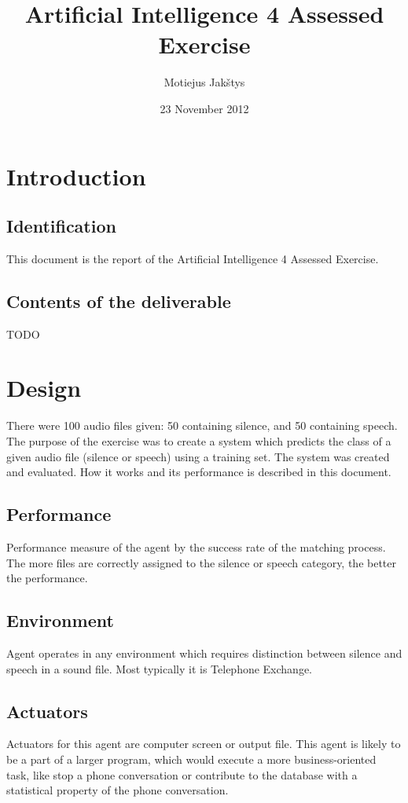 \documentclass[english,11pt]{article}
\numberwithin{equation}{section}
\begin{document}
\title{Artificial Intelligence 4 Assessed Exercise}
\author{Motiejus Jakštys}
\date{23 November 2012}

\maketitle
\pagebreak
\tableofcontents
\pagebreak

\section{Introduction}
\subsection{Identification}
This document is the report of the Artificial Intelligence 4 Assessed
Exercise.

\subsection{Contents of the deliverable}

TODO

\section{Design}
There were 100 audio files given: 50 containing silence, and 50 containing
speech. The purpose of the exercise was to create a system which predicts the
class of a given audio file (silence or speech) using a training set. The
system was created and evaluated. How it works and its performance is described
in this document.

\subsection{Performance}
Performance measure of the agent by the success rate of the matching
process. The more files are correctly assigned to the silence or speech
category, the better the performance.

\subsection{Environment}
Agent operates in any environment which requires distinction between silence
and speech in a sound file. Most typically it is Telephone Exchange.

\subsection{Actuators}
Actuators for this agent are computer screen or output file. This agent is
likely to be a part of a larger program, which would execute a more
business-oriented task, like stop a phone conversation or contribute to the
database with a statistical property of the phone conversation.
\end{document}
